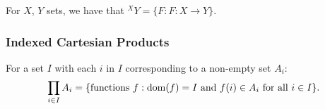 For $X$, $Y$ sets, we have that ${}^XY = \{F : F : X \to Y\}$.

\subsubsection{Indexed Cartesian Products}

For a set $I$ with each $i$ in $I$ corresponding to a
non-empty set $A_i$: \begin{align*}
    \prod_{i \in I} A_i = 
    \{\text{functions } f : \operatorname{dom}(f) = I \text{ and } f(i) \in A_i \text{ for all } i \in I\}.
\end{align*}
